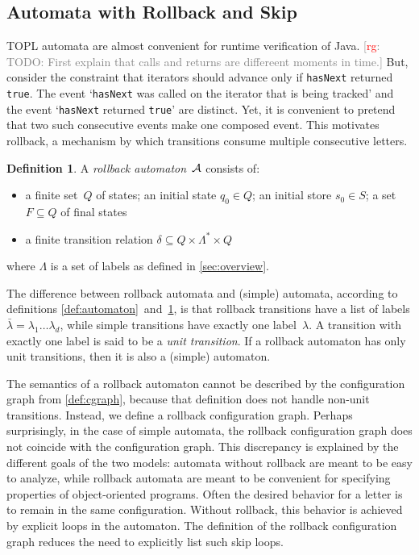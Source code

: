 \documentclass[9pt, preprint]{sigplanconf} %
\newcommand{\noterg}[2]{\textcolor{gray}{[\textcolor{red}{#1}: #2]}}
\newcommand{\rg}[1]{\noterg{rg}{#1}}
\theoremstyle{definition}
\newtheorem{definition}{Definition}
\theoremstyle{remark}
\begin{document}
\subsection{Automata with Rollback and Skip} %

TOPL automata are almost convenient for runtime verification of Java.
\rg{TODO: First explain that calls and returns are differeent moments in time.}
But, consider the constraint that iterators should advance only if {\tt hasNext} returned {\tt true}.
The event `{\tt hasNext} was called on the iterator that is being tracked' and the event `{\tt hasNext} returned {\tt true}' are distinct.
Yet, it is convenient to pretend that two such consecutive events make one composed event.
This motivates rollback, a mechanism by which transitions consume multiple consecutive letters.

\begin{definition}\label{def:rollback}
A \emph{rollback automaton}~${\cal A}$ consists of:
\begin{itemize}
\item a finite set~$Q$ of states; an initial state $q_0\in Q$; an initial store $s_0\in S$; a set $F\subseteq Q$ of final states
\item a finite transition relation $\delta\subseteq Q\times\Lambda^*\times Q$
\end{itemize}
where $\Lambda$ is a set of labels as defined in \autoref{sec:overview}.
\end{definition}

The difference between rollback automata and (simple) automata, according to definitions \ref{def:automaton}~and~\ref{def:rollback}, is that rollback transitions have a list of labels $\bar\lambda=\lambda_1\ldots\lambda_d$, while simple transitions have exactly one label~$\lambda$.
A transition with exactly one label is said to be a \emph{unit transition}.
If a rollback automaton has only unit transitions, then it is also a (simple) automaton.

The semantics of a rollback automaton cannot be described by the configuration graph from \autoref{def:cgraph}, because that definition does not handle non-unit transitions.
Instead, we define a rollback configuration graph.
Perhaps surprisingly, in the case of simple automata, the rollback configuration graph does not coincide with the configuration graph.
This discrepancy is explained by the different goals of the two models: automata without rollback are meant to be easy to analyze, while rollback automata are meant to be convenient for specifying properties of object-oriented programs.
Often the desired behavior for a letter is to remain in the same configuration.
Without rollback, this behavior is achieved by explicit loops in the automaton.
The definition of the rollback configuration graph reduces the need to explicitly list such skip loops.
\end{document}
